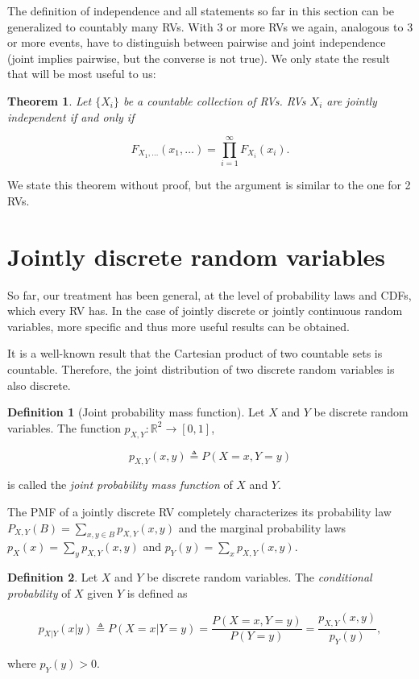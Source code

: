 \documentclass{book}
\theoremstyle{plain}%
\newtheorem{theorem}{Theorem}[section]
\theoremstyle{definition}
\newtheorem{definition}{Definition}[section]
\newlength{\arrow}
\begin{document}
The definition of independence and all statements so far in this section can be generalized to countably many RVs. With 3 or more RVs we again, analogous to 3 or more events, have to distinguish between pairwise and joint independence (joint implies pairwise, but the converse is not true). We only state the result that will be most useful to us:

\begin{theorem}
Let $\{X_i\}$ be a countable collection of RVs. RVs $X_i$ are jointly independent if and only if

$$F_{X_1,\dots}(x_1,\dots) = \prod_{i=1}^\infty F_{X_i}(x_i).$$
\end{theorem}

We state this theorem without proof, but the argument is similar to the one for 2 RVs.

\section{Jointly discrete random variables}

So far, our treatment has been general, at the level of probability laws and CDFs, which every RV has. In the case of jointly discrete or jointly continuous random variables, more specific and thus more useful results can be obtained.

It is a well-known result that the Cartesian product of two countable sets is countable. Therefore, the joint distribution of two discrete random variables is also discrete.

\begin{definition}[Joint probability mass function]
Let $X$ and $Y$ be discrete random variables. The function $p_{X,Y}: \mathbb{R}^2 \rightarrow [0,1]$, 

$$p_{X,Y}(x,y) \triangleq P(X = x, Y = y)$$ 

is called the \emph{joint probability mass function} of $X$ and $Y$.
\end{definition}

The PMF of a jointly discrete RV completely characterizes its probability law $P_{X,Y}(B) = \sum_{x,y \in B} p_{X,Y}(x,y)$ and the marginal probability laws $p_X(x) = \sum_y  p_{X,Y}(x,y)$ and $p_Y(y) = \sum_x p_{X,Y}(x,y)$.

\begin{definition}
Let $X$ and $Y$ be discrete random variables. The \emph{conditional probability} of $X$ given $Y$ is defined as

$$p_{X|Y}(x|y) \triangleq P(X = x|Y = y) = \frac{P(X=x, Y=y)}{P(Y=y)} = \frac{p_{X,Y}(x, y)}{p_Y(y)},$$

where $p_Y(y) > 0$.
\end{definition}
\end{document}
